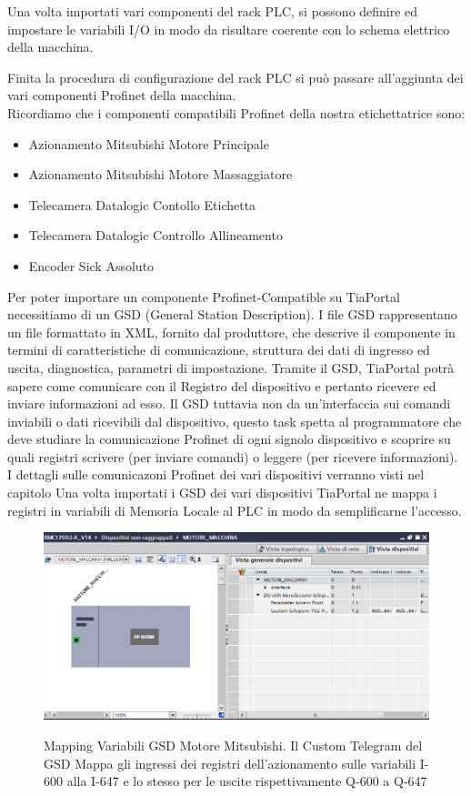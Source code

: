 \documentclass[12pt, a4paper, oneside]{book}
\begin{document}
	Una volta importati vari componenti del rack PLC, si possono definire ed impostare le variabili I/O in modo da risultare coerente con lo schema elettrico della macchina.
	
	Finita la procedura di configurazione del rack PLC si può passare all'aggiunta dei vari componenti Profinet della macchina. \\
	Ricordiamo che i componenti compatibili Profinet della nostra etichettatrice sono:
	\begin{itemize}
		\item Azionamento Mitsubishi Motore Principale
		\item Azionamento Mitsubishi Motore Massaggiatore
		\item Telecamera Datalogic Contollo Etichetta
		\item Telecamera Datalogic Controllo Allineamento
		\item Encoder Sick Assoluto
	\end{itemize}

	Per poter importare un componente Profinet-Compatible su TiaPortal necessitiamo di un GSD (General Station Description). I file GSD rappresentano un file formattato in XML, fornito dal produttore, che descrive il componente in termini di caratteristiche di comunicazione, struttura dei dati di ingresso ed uscita, diagnostica, parametri di impostazione. Tramite il GSD, TiaPortal potrà sapere come comunicare con il Registro del dispositivo e pertanto ricevere ed inviare informazioni ad esso. Il GSD tuttavia non da un'interfaccia sui comandi inviabili o dati ricevibili dal dispositivo, questo task spetta al programmatore che deve studiare la comunicazione Profinet di ogni signolo dispositivo e scoprire su quali registri scrivere (per inviare comandi) o leggere (per ricevere informazioni). I dettagli sulle comunicazoni Profinet dei vari dispositivi verranno visti nel capitolo \cite{profinet}
	Una volta importati i GSD dei vari dispositivi TiaPortal ne mappa i registri in variabili di Memoria Locale al PLC in modo da semplificarne l'accesso. 
	

	\begin{figure}[H]
		\centering
		\includegraphics[width=12cm]{Immagini/TIA1}
		\label{tia1}
		\caption{Mapping Variabili GSD Motore Mitsubishi. Il Custom Telegram del GSD Mappa gli ingressi dei registri dell'azionamento sulle variabili I-600 alla I-647 e lo stesso per le uscite rispettivamente Q-600 a Q-647}
	\end{figure}
\end{document}
